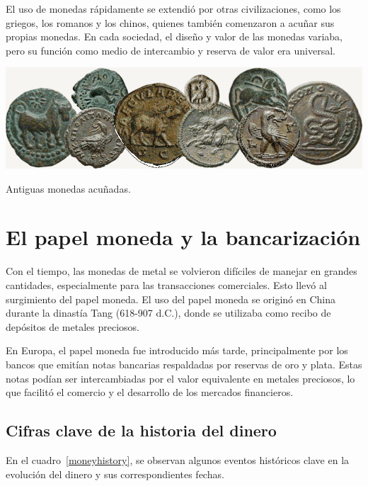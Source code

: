 El uso de monedas rápidamente se extendió por otras civilizaciones, como los griegos, los romanos y los chinos, quienes también comenzaron a acuñar sus propias monedas. En cada sociedad, el diseño y valor de las monedas variaba, pero su función como medio de intercambio y reserva de valor era universal.

\begin{imagen}[h!]
	\centering
	\includegraphics[width=\textwidth]{./media/coin.png}
	\caption{Antiguas monedas acuñadas.}
\end{imagen}

\section{El papel moneda y la bancarización}

Con el tiempo, las monedas de metal se volvieron difíciles de manejar en grandes cantidades, especialmente para las transacciones comerciales. Esto llevó al surgimiento del papel moneda. El uso del papel moneda se originó en China durante la dinastía Tang (618-907 d.C.), donde se utilizaba como recibo de depósitos de metales preciosos.

En Europa, el papel moneda fue introducido más tarde, principalmente por los bancos que emitían notas bancarias respaldadas por reservas de oro y plata. Estas notas podían ser intercambiadas por el valor equivalente en metales preciosos, lo que facilitó el comercio y el desarrollo de los mercados financieros.

\subsection{Cifras clave de la historia del dinero}

En el cuadro~\ref{moneyhistory}, se observan algunos eventos históricos clave en la evolución del dinero y sus correspondientes fechas.

